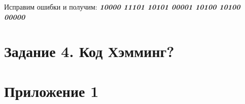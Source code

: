 \documentclass[a5paper, 10pt]{article}
\theoremstyle{definition}
\theoremstyle{plain}
\theoremstyle{remark}
\begin{document}
Исправим ошибки и получим:  \textbf{\textit{10000 11101 10101 00001 10100 10100 00000}}


\section{Задание 4. Код Хэмминг?}
\newpage
\section{Приложение 1}
\begin{figure}[h!]
\begin{minipage}[h!]{0.49\linewidth}
\end{minipage}
\label{ris:image1}
\end{figure}
\end{document}
